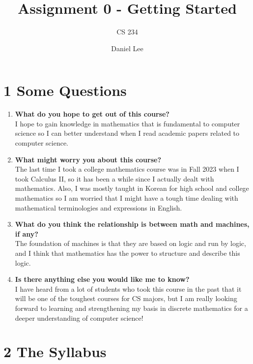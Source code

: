 \documentclass[10pt]{article}
\title{Assignment 0 - Getting Started }
\author{CS 234}
\date{Daniel Lee}
\begin{document}
\maketitle

\section*{1 \quad Some Questions}

\begin{enumerate}
      \item \textbf{What do you hope to get out of this course?}
            \\ I hope to gain knowledge in mathematics that is fundamental to computer science so I can better understand when I read academic papers related to computer science.
      \item \textbf{What might worry you about this course?}
            \\ The last time I took a college mathematics course was in Fall 2023 when I took Calculus II, so it has been a while since I actually dealt with mathematics. Also, I was mostly taught in Korean for high school and college mathematics so I am worried that I might have a tough time dealing with mathematical terminologies and expressions in English.
      \item \textbf{What do you think the relationship is between math and machines, if any?}
            \\ The foundation of machines is that they are based on logic and run by logic, and I think that mathematics has the power to structure and describe this logic.
      \item \textbf{Is there anything else you would like me to know?}
            \\ I have heard from a lot of students who took this course in the past that it will be one of the toughest courses for CS majors, but I am really looking forward to learning and strengthening my basis in discrete mathematics for a deeper understanding of computer science!
\end{enumerate}


\section*{2 \quad The Syllabus}
\end{document}
